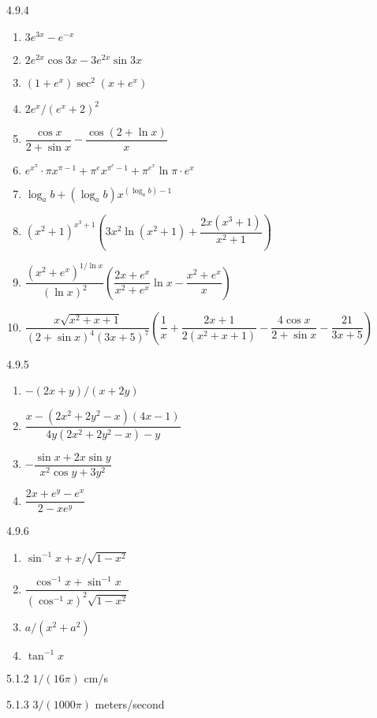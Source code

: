 \begin{Answer}{4.9.4}
\begin{enumerate}
	\item	$3e^{3x}-e^{-x}$
	\item	$2e^{2x}\cos 3x-3e^{2x}\sin 3x$
	\item	$(1+e^x)\sec^2(x+e^x)$
	\item	$2e^x/(e^x+2)^2$
	\item	$\dfrac{\cos x}{2+\sin x}-\dfrac{\cos(2+\ln	x)}{x}$
	\item	$e^{x^{\pi}}\cdot\pi x^{\pi-1}+\pi^e x^{\pi^e-1}+\pi^{e^x}\ln\pi\cdot e^x$
	\item	$\log_{a}b+(\log_{a}b) x^{(\log_{a}b)-1}$
	\item	$(x^2+1)^{x^3+1}\left(3x^2\ln(x^2+1)+\dfrac{2x(x^3+1)}{x^2+1}\right)$
	\item	$\dfrac{(x^2+e^x)^{1/\ln x}}{(\ln x)^2}\left(\dfrac{2x+e^x}{x^2+e^x}\ln	x-\dfrac{x^2+e^x}{x}\right)$
	\item	$\dfrac{x\sqrt{x^2+x+1}}{(2+\sin x)^4 (3x+5)^7} \left(\dfrac{1}{x}+\dfrac{2x+1}{2(x^2+x+1)}-\dfrac{4\cos x}{2+\sin x}-\dfrac{21}{3x+5}\right)$
\end{enumerate}
\end{Answer}
\begin{Answer}{4.9.5}
\begin{enumerate}
	\item	$-(2x+y)/(x+2y)$
	\item	$\dfrac{x-(2x^2+2y^2-x) (4x-1)}{4y(2x^2+2y^2-x)-y}$
	\item	$-\dfrac{\sin x+2x\sin y}{x^2\cos y+3y^2}$
	\item	$\dfrac{2x+e^y-e^x}{2-xe^y}$
\end{enumerate}
\end{Answer}
\begin{Answer}{4.9.6}
\begin{enumerate}
	\item	$\sin^{-1}x+x/\sqrt{1-x^2}$
	\item	$\dfrac{\cos^{-1}x+\sin^{-1}x}{(\cos^{-1}x)^2 \sqrt{1-x^2}}$
	\item	$a/(x^2+a^2)$
	\item	$\tan^{-1}x$
\end{enumerate}
\end{Answer}
\begin{Answer}{5.1.2}
	$1/(16\pi)$ cm/s
\end{Answer}
\begin{Answer}{5.1.3}
	$3/(1000\pi)$ meters/second
\end{Answer}
